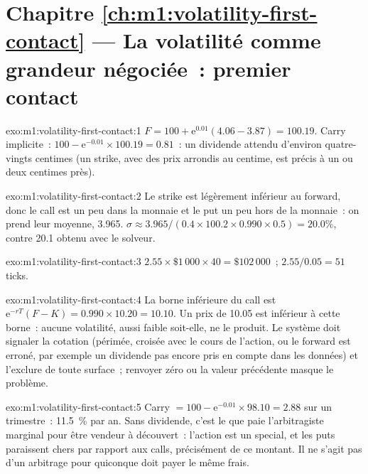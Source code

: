 \section*{Chapitre \ref{ch:m1:volatility-first-contact} --- La volatilité comme grandeur négociée~: premier contact}

\begin{solution}{exo:m1:volatility-first-contact:1}
$F = 100 + \mathrm{e}^{0.01}(4.06 - 3.87) = 100.19$. Carry implicite~: $100 -
\mathrm{e}^{-0.01} \times 100.19 = 0.81$~: un dividende attendu d'environ quatre-vingts
centimes (un strike, avec des prix arrondis au centime, est précis à un ou deux centimes près).
\end{solution}

\begin{solution}{exo:m1:volatility-first-contact:2}
Le strike est légèrement inférieur au forward, donc le call est un peu dans la
monnaie et le put un peu hors de la monnaie~: on prend leur moyenne, 3.965. $\sigma \approx
3.965/(0.4 \times 100.2 \times 0.990 \times 0.5) = 20.0\%$, contre 20.1 obtenu avec
le solveur.
\end{solution}

\begin{solution}{exo:m1:volatility-first-contact:3}
$2.55 \times \$1\,000 \times 40 = \$102\,000$~; $2.55/0.05 = 51$ ticks.
\end{solution}

\begin{solution}{exo:m1:volatility-first-contact:4}
La borne inférieure du call est $\mathrm{e}^{-rT}(F - K) = 0.990 \times 10.20 =
10.10$. Un prix de 10.05 est inférieur à cette borne~: aucune volatilité, aussi faible soit-elle, ne le produit.
Le système doit signaler la cotation (périmée, croisée avec le cours de l'action, ou
le forward est erroné, par exemple un dividende pas encore pris en compte dans les données) et l'exclure
de toute surface~; renvoyer zéro ou la valeur précédente masque le problème.
\end{solution}

\begin{solution}{exo:m1:volatility-first-contact:5}
Carry $= 100 - \mathrm{e}^{-0.01} \times 98.10 = 2.88$ sur un trimestre~: 11.5~\% par
an. Sans dividende, c'est le  que paie l'arbitragiste marginal pour
être vendeur à découvert~: l'action est un special, et les puts paraissent chers par rapport
aux calls, précisément de ce montant. Il ne s'agit pas d'un arbitrage pour quiconque doit payer
le même frais.
\end{solution}

